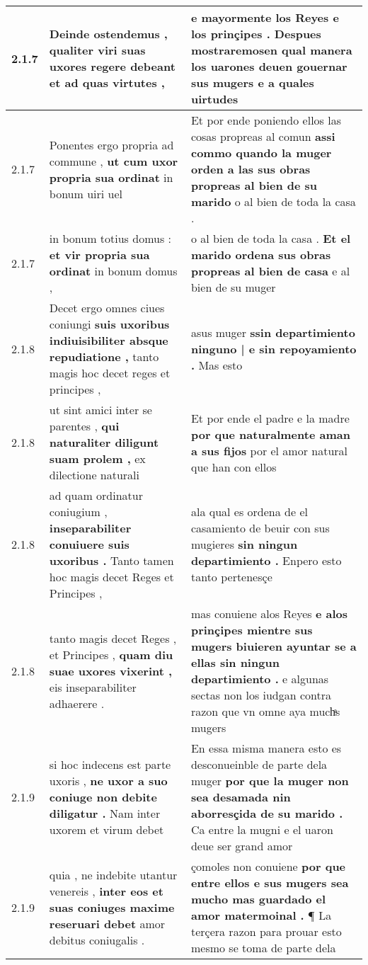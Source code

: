 \begin{tabular}{|p{1cm}|p{6.5cm}|p{6.5cm}|}
2.1.7 & Deinde ostendemus , \textbf{ qualiter viri suas uxores regere debeant } et ad quas virtutes , & e mayormente los Reyes e los prinçipes . \textbf{ Despues mostraremosen qual manera los uarones deuen gouernar sus mugers } e a quales uirtudes \\\hline
2.1.7 & Ponentes ergo propria ad commune , \textbf{ ut cum uxor propria sua ordinat } in bonum uiri uel & Et por ende poniendo ellos las cosas propreas al comun \textbf{ assi commo quando la muger orden a las sus obras propreas al bien de su marido } o al bien de toda la casa . \\\hline
2.1.7 & in bonum totius domus : \textbf{ et vir propria sua ordinat } in bonum domus , & o al bien de toda la casa . \textbf{ Et el marido ordena sus obras propreas al bien de casa } e al bien de su muger \\\hline
2.1.8 & Decet ergo omnes ciues coniungi \textbf{ suis uxoribus indiuisibiliter absque repudiatione , } tanto magis hoc decet reges et principes , & asus muger \textbf{ ssin departimiento ninguno | e sin repoyamiento . } Mas esto \\\hline
2.1.8 & ut sint amici inter se parentes , \textbf{ qui naturaliter diligunt suam prolem , } ex dilectione naturali & Et por ende el padre e la madre \textbf{ por que naturalmente aman a sus fijos } por el amor natural que han con ellos \\\hline
2.1.8 & ad quam ordinatur coniugium , \textbf{ inseparabiliter conuiuere suis uxoribus . } Tanto tamen hoc magis decet Reges et Principes , & ala qual es ordena de el casamiento de beuir con sus mugieres \textbf{ sin ningun departimiento . } Enpero esto tanto pertenesçe \\\hline
2.1.8 & tanto magis decet Reges , et Principes , \textbf{ quam diu suae uxores vixerint , } eis inseparabiliter adhaerere . & mas conuiene alos Reyes \textbf{ e alos prinçipes mientre sus mugers biuieren ayuntar se a ellas sin ningun departimiento . } e algunas sectas non los iudgan contra razon que vn omne aya muchͣs mugers \\\hline
2.1.9 & si hoc indecens est parte uxoris , \textbf{ ne uxor a suo coniuge non debite diligatur . } Nam inter uxorem et virum debet & En essa misma manera esto es desconueinble de parte dela muger \textbf{ por que la muger non sea desamada nin aborresçida de su marido . } Ca entre la mugni e el uaron deue ser grand amor \\\hline
2.1.9 & quia , ne indebite utantur venereis , \textbf{ inter eos et suas coniuges maxime reseruari debet } amor debitus coniugalis . & çomoles non conuiene \textbf{ por que entre ellos e sus mugers sea mucho mas guardado el amor matermoinal . } ¶ La terçera razon para prouar esto mesmo se toma de parte dela \\\hline

\end{tabular}
